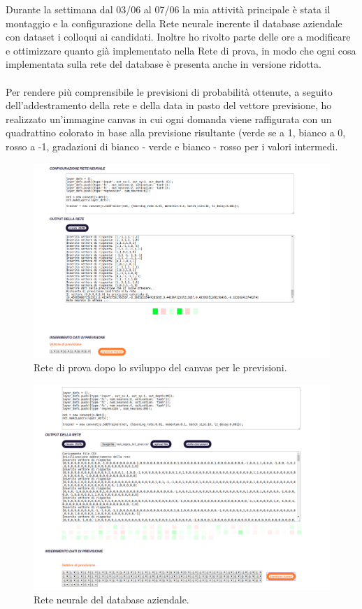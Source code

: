 Durante la settimana dal 03/06 al 07/06 la mia attivit\`a principale \`e stata il montaggio e la configurazione della Rete neurale inerente il database aziendale con dataset i colloqui ai candidati.
Inoltre ho rivolto parte delle ore a modificare e ottimizzare quanto gi\`a implementato nella Rete di prova, in modo che ogni cosa implementata sulla rete del database \`e presenta anche in versione ridotta.\\\\
Per rendere pi\`u comprensibile le previsioni di probabilit\`a ottenute, a seguito dell'addestramento della rete e della data in pasto del vettore previsione, ho realizzato un'immagine canvas in cui ogni domanda viene raffigurata con un quadrattino colorato in base alla previsione risultante (verde se a 1, bianco a 0, rosso a -1, gradazioni di bianco - verde e bianco - rosso per i valori intermedi.
\begin{figure}[H]
\centering
	\includegraphics[width=0.90\linewidth]{./image/rete_prova-canvas.png}
	\caption{Rete di prova dopo lo sviluppo del canvas per le previsioni.}
\end{figure}

\begin{figure}[H]
\centering
	\includegraphics[width=0.90\linewidth]{./image/rete_db.png}
	\caption{Rete neurale del database aziendale.}
\end{figure}
 
